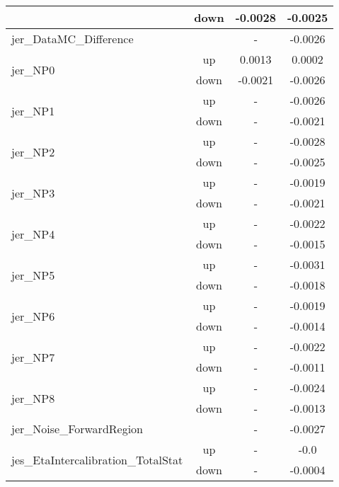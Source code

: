 \begin{table}[h!]
\begin{tabular}{lccc}
                                       & down &  -0.0028     &     -0.0025       \\ \hline
\multirow{2}{*}{jer\_DataMC\_Difference}  &  & \multirow{2}{*}{-}  & \multirow{2}{*}{-0.0026}  \\  \\ \hline
\multirow{2}{*}{jer\_NP0}      & up   &     0.0013     &     0.0002      \\
                                       & down &       -0.0021     &     -0.0026       \\ \hline
\multirow{2}{*}{jer\_NP1}      & up   &     -     &     -0.0026      \\
                                       & down &        -     &     -0.0021       \\ \hline
\multirow{2}{*}{jer\_NP2}      & up   &     -      &     -0.0028      \\
                                       & down &       -     &     -0.0025       \\ \hline
\multirow{2}{*}{jer\_NP3}      & up   &     -     &     -0.0019      \\
                                       & down &       -     &     -0.0021       \\ \hline
\multirow{2}{*}{jer\_NP4}      & up   &     -    &     -0.0022      \\
                                       & down &  -    &     -0.0015       \\ \hline
\multirow{2}{*}{jer\_NP5}      & up   &     -    &     -0.0031      \\
                                       & down & -   &     -0.0018       \\ \hline
\multirow{2}{*}{jer\_NP6}      & up   &     -   &     -0.0019      \\
                                       & down &  -    &     -0.0014       \\ \hline
\multirow{2}{*}{jer\_NP7}      & up   &     -     &     -0.0022      \\
                                       & down &    -     &     -0.0011       \\ \hline
\multirow{2}{*}{jer\_NP8}      & up   &     -     &     -0.0024      \\
                                       & down &      -    &     -0.0013       \\ \hline
\multirow{2}{*}{jer\_Noise\_ForwardRegion}  &  &  \multirow{2}{*}{-}  & \multirow{2}{*}{-0.0027}  \\  \\ \hline
\multirow{2}{*}{jes\_EtaIntercalibration\_TotalStat}      & up   &       -     &     -0.0      \\
                                       & down &     -        &     -0.0004       \\ \hline
\end{tabular}
\end{table}



